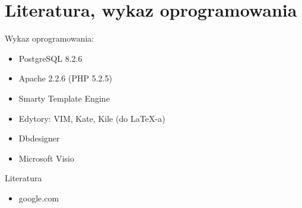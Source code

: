 \section{Literatura, wykaz oprogramowania}
Wykaz oprogramowania:
\begin{itemize}
    \item PostgreSQL 8.2.6
    \item Apache 2.2.6  (PHP 5.2.5)
    \item Smarty Template Engine
    \item Edytory: VIM, Kate, Kile (do LaTeX-a)
    \item Dbdesigner
    \item Microsoft Visio
\end{itemize}

Literatura
\begin{itemize}
 \item google.com
\end{itemize}

